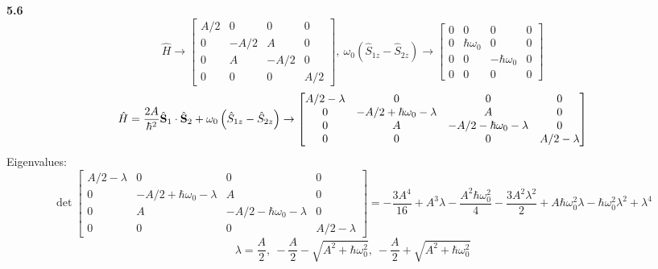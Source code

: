 \documentclass[english]{article}
\begin{document}
\noindent
\textbf{5.6}\\
\[
\hat{H}\rightarrow
\begin{bmatrix}
A/2 & 0 & 0 & 0\\
0 & -A/2 & A & 0\\
0 & A & -A/2 & 0\\
0 & 0 & 0 & A/2
\end{bmatrix}
,\ 
\omega_0\left(\hat{S}_{1z}-\hat{S}_{2z}\right)\rightarrow
\begin{bmatrix}
0 & 0 & 0 & 0\\
0 & \hbar\omega_0 & 0 & 0\\
0 & 0 & -\hbar\omega_0 & 0\\
0 & 0 & 0 & 0
\end{bmatrix}
\]
\[
\hat{H}=\frac{2A}{\hbar^2}\hat{\vb{S}}_1\cdot\hat{\vb{S}}_2+\omega_0\left(\hat{S}_{1z}-\hat{S}_{2z}\right)\rightarrow
\begin{bmatrix}
A/2-\lambda & 0 & 0 & 0\\
0 & -A/2+\hbar\omega_0-\lambda & A & 0\\
0 & A & -A/2-\hbar\omega_0-\lambda & 0\\
0 & 0 & 0 & A/2-\lambda
\end{bmatrix}
\]
Eigenvalues:
\[
\det
\begin{bmatrix}
A/2-\lambda & 0 & 0 & 0\\
0 & -A/2+\hbar\omega_0-\lambda & A & 0\\
0 & A & -A/2-\hbar\omega_0-\lambda & 0\\
0 & 0 & 0 & A/2-\lambda
\end{bmatrix}
=- \frac{3 A^{4}}{16} + A^{3} \lambda - \frac{A^{2} \hbar\omega_0^{2}}{4} - \frac{3 A^{2} \lambda^{2}}{2} + A \hbar\omega_0^{2} \lambda - \hbar\omega_0^{2} \lambda^{2} + \lambda^{4}
\]
$$\lambda =  \frac{A}{2}, \  - \frac{A}{2} - \sqrt{A^{2} + \hbar\omega_0^{2}}, \  - \frac{A}{2} + \sqrt{A^{2} + \hbar\omega_0^{2}}$$
\end{document}
